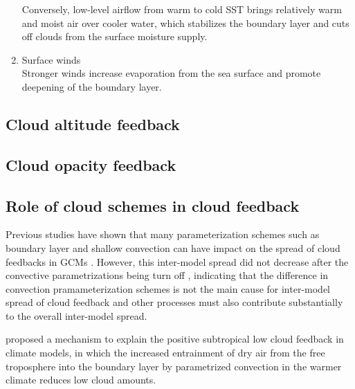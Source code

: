 \begin{enumerate}[label={(\arabic*)}]
    Conversely, low-level airflow from warm to cold SST brings relatively warm and moist air over cooler water, which stabilizes the boundary layer and cuts off clouds from the surface moisture supply. 
    
    \item Surface winds\\
    Stronger winds increase evaporation from the sea surface and promote deepening of the boundary layer.
    
\end{enumerate}


\subsection{Cloud altitude feedback}

\subsection{Cloud opacity feedback}


\subsection{Role of cloud schemes in cloud feedback}


Previous studies have shown that many parameterization schemes such as boundary layer and shallow convection can have impact on the spread of cloud feedbacks in GCMs \cite[e.g.,][]{Gettelman2012,Zhang2013CGILS,Sherwood2014spread}.
However, this inter-model spread did not decrease after the convective parametrizations being turn off \citep{Webb2015}, indicating that the difference in convection pramameterization schemes is not the main cause for inter-model spread of cloud feedback and other processes must also contribute substantially to the overall inter-model spread.

\cite{Zhang2013CGILS} proposed a mechanism to explain the positive subtropical low cloud feedback in climate models, in which the increased entrainment of dry air from the free troposphere into the boundary layer by parametrized convection in the warmer climate reduces low cloud amounts.


